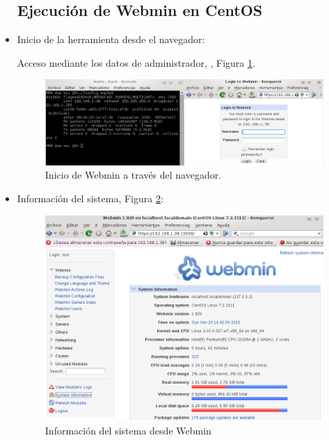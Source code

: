 \begin{itemize}
\newpage

\subsection{Ejecución de Webmin en CentOS}
	\item Inicio de la herramienta desde el navegador:
	
		Acceso mediante los datos de administrador, , Figura \ref{fig:figura43}.
	\begin{figure}[H] %
		\centering
		\includegraphics[scale=0.6]{figuras/figura43.png} 
		\caption{Inicio de Webmin a través del navegador.} 
		\label{fig:figura43}
	\end{figure}

	\item Información del sistema, Figura \ref{fig:figura44}:
	\begin{figure}[H] %
		\centering
		\includegraphics[scale=0.6]{figuras/figura44.png} 
		\caption{Información del sistema desde Webmin} 
		\label{fig:figura44}
	\end{figure}

\newpage


\end{itemize}
